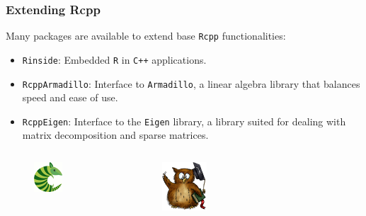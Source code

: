 \documentclass{beamer}
\def\code#1{\texttt{#1}} %
\begin{document}
\begin{frame}
\frametitle{Extending Rcpp}

Many packages are available to extend base \code{Rcpp} functionalities:
\begin{itemize}
    \item \code{Rinside}: Embedded \code{R} in \code{C++} applications. \pause
    \item \code{RcppArmadillo}: Interface to \code{Armadillo}, a linear algebra library that balances speed and ease of use. \pause
    \item \code{RcppEigen}: Interface to the \code{Eigen} library, a library suited for dealing with matrix decomposition and sparse matrices. \pause
\end{itemize}
\begin{columns}
\begin{figure}[htb]
    \centering
    \includegraphics[width=0.5\textwidth]{armadillo.png}
\end{figure}
\begin{figure}[htb]
    \centering
    \includegraphics[width=0.5\textwidth]{eigen.png}
\end{figure}
\end{columns}

\end{frame}
\end{document}
